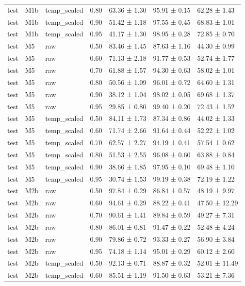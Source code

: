 \begin{tabular}{lllrlll}
test & M1b & temp\_scaled & 0.80 & 63.36 ± 1.30 & 95.91 ± 0.15 & 62.28 ± 1.43 \\
test & M1b & temp\_scaled & 0.90 & 51.42 ± 1.18 & 97.55 ± 0.45 & 68.83 ± 1.01 \\
test & M1b & temp\_scaled & 0.95 & 41.17 ± 1.30 & 98.95 ± 0.28 & 72.85 ± 0.70 \\
test & M5 & raw & 0.50 & 83.46 ± 1.45 & 87.63 ± 1.16 & 44.30 ± 0.99 \\
test & M5 & raw & 0.60 & 71.13 ± 2.18 & 91.77 ± 0.53 & 52.74 ± 1.77 \\
test & M5 & raw & 0.70 & 61.88 ± 1.57 & 94.30 ± 0.63 & 58.02 ± 1.01 \\
test & M5 & raw & 0.80 & 50.56 ± 1.09 & 96.01 ± 0.72 & 64.60 ± 1.31 \\
test & M5 & raw & 0.90 & 38.12 ± 1.04 & 98.02 ± 0.05 & 69.68 ± 1.37 \\
test & M5 & raw & 0.95 & 29.85 ± 0.80 & 99.40 ± 0.20 & 72.43 ± 1.52 \\
test & M5 & temp\_scaled & 0.50 & 84.11 ± 1.73 & 87.34 ± 0.86 & 44.02 ± 1.33 \\
test & M5 & temp\_scaled & 0.60 & 71.74 ± 2.66 & 91.64 ± 0.44 & 52.22 ± 1.02 \\
test & M5 & temp\_scaled & 0.70 & 62.57 ± 2.27 & 94.19 ± 0.41 & 57.54 ± 0.62 \\
test & M5 & temp\_scaled & 0.80 & 51.53 ± 2.55 & 96.08 ± 0.60 & 63.88 ± 0.84 \\
test & M5 & temp\_scaled & 0.90 & 38.66 ± 1.85 & 97.95 ± 0.10 & 69.48 ± 1.10 \\
test & M5 & temp\_scaled & 0.95 & 30.74 ± 1.53 & 99.19 ± 0.38 & 72.19 ± 1.22 \\
test & M2b & raw & 0.50 & 97.84 ± 0.29 & 86.84 ± 0.57 & 48.19 ± 9.97 \\
test & M2b & raw & 0.60 & 94.61 ± 0.29 & 88.22 ± 0.41 & 47.50 ± 12.29 \\
test & M2b & raw & 0.70 & 90.61 ± 1.41 & 89.84 ± 0.59 & 49.27 ± 7.31 \\
test & M2b & raw & 0.80 & 86.01 ± 0.81 & 91.47 ± 0.22 & 52.48 ± 4.24 \\
test & M2b & raw & 0.90 & 79.86 ± 0.72 & 93.33 ± 0.27 & 56.90 ± 3.84 \\
test & M2b & raw & 0.95 & 74.18 ± 1.14 & 95.01 ± 0.29 & 60.12 ± 2.60 \\
test & M2b & temp\_scaled & 0.50 & 92.13 ± 0.71 & 88.87 ± 0.32 & 52.01 ± 11.49 \\
test & M2b & temp\_scaled & 0.60 & 85.51 ± 1.19 & 91.50 ± 0.63 & 53.21 ± 7.36 \\

\end{tabular}
